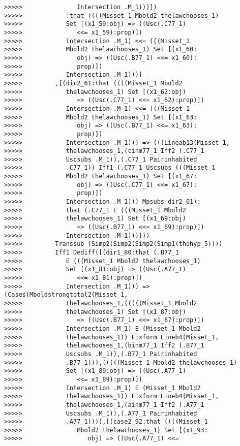 \documentclass[12pt]{article}
\begin{document}
\begin{verbatim}
>>>>>               Intersection .M_1)))])
>>>>>            :that ((((Misset_1 Mbold2 thelawchooses_1)
>>>>>            Set [(x1_59:obj) => ((Usc(.C77_1)
>>>>>               <<= x1_59):prop)])
>>>>>            Intersection .M_1) <<= (((Misset_1
>>>>>            Mbold2 thelawchooses_1) Set [(x1_60:
>>>>>               obj) => ((Usc(.B77_1) <<= x1_60):
>>>>>               prop)])
>>>>>            Intersection .M_1)))]
>>>>>         ,[(dir2_61:that ((((Misset_1 Mbold2
>>>>>            thelawchooses_1) Set [(x1_62:obj)
>>>>>               => ((Usc(.C77_1) <<= x1_62):prop)])
>>>>>            Intersection .M_1) <<= (((Misset_1
>>>>>            Mbold2 thelawchooses_1) Set [(x1_63:
>>>>>               obj) => ((Usc(.B77_1) <<= x1_63):
>>>>>               prop)])
>>>>>            Intersection .M_1))) => (((Lineab13(Misset_1,
>>>>>            thelawchooses_1,(cinm77_1 Iff2 (.C77_1
>>>>>            Uscsubs .M_1)),(.C77_1 Pairinhabited
>>>>>            .C77_1)) Iff1 (.C77_1 Uscsubs (((Misset_1
>>>>>            Mbold2 thelawchooses_1) Set [(x1_67:
>>>>>               obj) => ((Usc(.C77_1) <<= x1_67):
>>>>>               prop)])
>>>>>            Intersection .M_1))) Mpsubs dir2_61):
>>>>>            that (.C77_1 E (((Misset_1 Mbold2
>>>>>            thelawchooses_1) Set [(x1_69:obj)
>>>>>               => ((Usc(.B77_1) <<= x1_69):prop)])
>>>>>            Intersection .M_1)))]))
>>>>>         Transsub (Simp2(Simp2(Simp2(Simp1(thehyp_5))))
>>>>>         Iff1 Dediff([(dir1_80:that (.B77_1
>>>>>            E (((Misset_1 Mbold2 thelawchooses_1)
>>>>>            Set [(x1_81:obj) => ((Usc(.A77_1)
>>>>>               <<= x1_81):prop)])
>>>>>            Intersection .M_1))) => (Cases(Mboldstrongtotal2(Misset_1,
>>>>>            thelawchooses_1,(((((Misset_1 Mbold2
>>>>>            thelawchooses_1) Set [(x1_87:obj)
>>>>>               => ((Usc(.B77_1) <<= x1_87):prop)])
>>>>>            Intersection .M_1) E (Misset_1 Mbold2
>>>>>            thelawchooses_1)) Fixform Lineb4(Misset_1,
>>>>>            thelawchooses_1,(binm77_1 Iff2 (.B77_1
>>>>>            Uscsubs .M_1)),(.B77_1 Pairinhabited
>>>>>            .B77_1))),(((((Misset_1 Mbold2 thelawchooses_1)
>>>>>            Set [(x1_89:obj) => ((Usc(.A77_1)
>>>>>               <<= x1_89):prop)])
>>>>>            Intersection .M_1) E (Misset_1 Mbold2
>>>>>            thelawchooses_1)) Fixform Lineb4(Misset_1,
>>>>>            thelawchooses_1,(ainm77_1 Iff2 (.A77_1
>>>>>            Uscsubs .M_1)),(.A77_1 Pairinhabited
>>>>>            .A77_1)))),[(case2_92:that ((((Misset_1
>>>>>               Mbold2 thelawchooses_1) Set [(x1_93:
>>>>>                  obj) => ((Usc(.A77_1) <<=

\end{verbatim}
\end{document}
